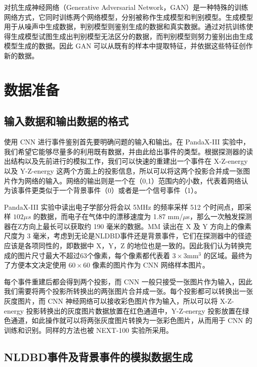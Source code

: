 对抗生成神经网络（Generative Adversarial Network，GAN）是一种特殊的训练网络方式，它同时训练两个网络模型，分别被称作生成模型和判别模型。生成模型用于从噪声中生成数据，判别模型则鉴别生成的数据和真实数据。通过对抗训练使得生成模型试图生成出判别模型无法区分的数据，而判别模型则努力鉴别出由生成模型生成的数据。因此 GAN 可以从既有的样本中提取特征，并依据这些特征创作新的数据。

\section{数据准备}
\label{section:data_prepare}

\subsection{输入数据和输出数据的格式}

使用 CNN 进行事件鉴别首先要明确问题的输入和输出。在 PandaX-III 实验中，我们希望它能够尽量多的利用既有数据，并由此给出事件的类型。根据探测器的读出结构以及先前进行的模拟工作，我们可以快速的重建出一个事件在 X-Z-energy 以及 Y-Z-energy 这两个方面上的投影信息，所以可以将这两个投影合并成一张图片作为网络的输入。网络的输出则是一个在（0,1）范围内的小数，代表着网络认为该事件更类似于一个背景事件（0）或者是一个信号事件（1）。

PandaX-III 实验中读出电子学部分将会以 5MHz 的频率采样 512 个时间点，即采样 $102\mu s$ 的数据，而电子在气体中的漂移速度为 1.87 mm/$\mu$s，那么一次触发探测器在Z方向上最长可以获取约 190 毫米的数据。MM 读出在 X 及 Y 方向上的像素尺度为 3 毫米，考虑到无论是NLDBD事件还是背景事件，它们在探测器中的径迹应该是各项同性的，即数据中 X，Y，Z 的地位也是一致的。因此我们认为转换完成的图片尺寸最大不超过63个像素，每个像素都代表着 $3\times 3$mm$^3$ 的区域。最终为了方便本文决定使用 $60\times60$ 像素的图片作为 CNN 网络样本图片。

每个事件重建后都会得到两个投影，而 CNN 一般只接受一张图片作为输入，因此我们需要将两个投影所转换出的两张图片合并成一张。每个投影都可以转换出一张灰度图片，而 CNN 神经网络可以接收彩色图片作为输入，所以可以将 X-Z-energy 投影转换出的灰度图片数据放置在红色通道中，Y-Z-energy 投影放置在绿色通道，如此操作就可以将两张灰度图片转换为一张彩色图片，从而用于 CNN 的训练和识别。同样的方法也被 NEXT-100 实验所采用\supercite{renner2017background}。

\subsection{NLDBD事件及背景事件的模拟数据生成}
\label{chapter:generate_nldbd}


